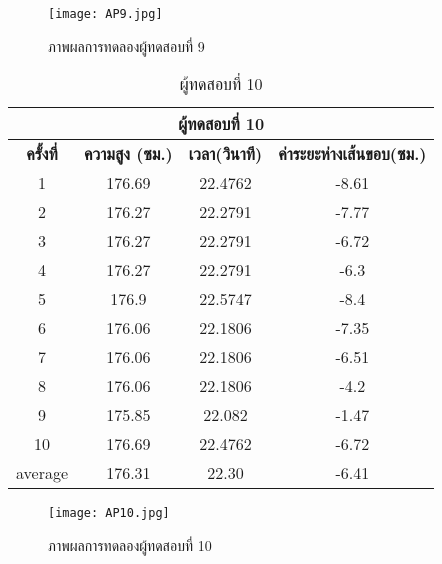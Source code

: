 \begin{figure}[!ht]
\centering
\texttt{[image: AP9.jpg]}
\caption{ภาพผลการทดลองผู้ทดสอบที่ 9 }
\label{fig:AP9.jpg}
\end{figure}


\begin{table}[!hb] 
\centering
\caption{ผู้ทดสอบที่ 10}
\label{tab:10}
\begin{tabular}{|c|c|c|c|}
\hline
\multicolumn{4}{|c|}{\textbf{ผู้ทดสอบที่ 10}}    \\ \hline
\textbf{ครั้งที่} & \textbf{ความสูง (ซม.)} & \textbf{เวลา(วินาที)} & \textbf{ค่าระยะห่างเส้นขอบ(ซม.)}  \\ \hline
1       & 176.69 & 22.4762 & -8.61    \\ \hline
2       & 176.27 & 22.2791 & -7.77    \\ \hline
3       & 176.27 & 22.2791 & -6.72     \\ \hline
4       & 176.27 & 22.2791 & -6.3      \\ \hline
5       & 176.9  & 22.5747 & -8.4     \\ \hline
6       & 176.06 & 22.1806 & -7.35     \\ \hline
7       & 176.06 & 22.1806 & -6.51     \\ \hline
8       & 176.06 & 22.1806 & -4.2        \\ \hline
9       & 175.85 & 22.082  & -1.47      \\ \hline
10      & 176.69 & 22.4762 & -6.72     \\ \hline
average & 176.31 & 22.30   & -6.41   \\ \hline
\end{tabular}
\end{table}
\begin{figure}[!ht]
\centering
\texttt{[image: AP10.jpg]}
\caption{ภาพผลการทดลองผู้ทดสอบที่ 10 }
\label{fig:AP10.jpg}
\end{figure}


